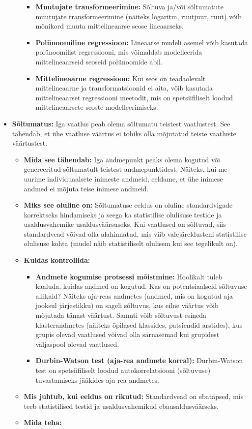 \documentclass[
]{book}
\providecommand{\tightlist}{%
  \setlength{\itemsep}{0pt}\setlength{\parskip}{0pt}}
\begin{document}
\begin{itemize}
\begin{itemize}
    \begin{itemize}
    \tightlist
    \item
      \textbf{Muutujate transformeerimine:} Sõltuva ja/või sõltumatute muutujate transformeerimine (näiteks logaritm, ruutjuur, ruut) võib mõnikord muuta mittelineaarse seose lineaarseks.
    \item
      \textbf{Polünoomiline regressioon:} Lineaarse mudeli asemel võib kasutada polünoomilist regressiooni, mis võimaldab modelleerida mittelineaarseid seoseid polünoomide abil.
    \item
      \textbf{Mittelineaarne regressioon:} Kui seos on teadaolevalt mittelineaarne ja transformatsioonid ei aita, võib kasutada mittelineaarset regressiooni meetodit, mis on spetsiifiliselt loodud mittelineaarsete seoste modelleerimiseks.
    \end{itemize}
  \end{itemize}
\item
  \textbf{Sõltumatus:} Iga vaatlus peab olema sõltumatu teistest vaatlustest. See tähendab, et ühe vaatluse väärtus ei tohiks olla mõjutatud teiste vaatluste väärtustest.

  \begin{itemize}
  \tightlist
  \item
    \textbf{Mida see tähendab:} Iga andmepunkt peaks olema kogutud või genereeritud sõltumatult teistest andmepunktidest. Näiteks, kui me uurime individuaalsete inimeste andmeid, eeldame, et ühe inimese andmed ei mõjuta teise inimese andmeid.
  \item
    \textbf{Miks see oluline on:} Sõltumatuse eeldus on oluline standardvigade korrektseks hindamiseks ja seega ka statistilise olulisuse testide ja usaldusvahemike usaldusväärsuseks. Kui vaatlused on sõltuvad, siis standardvead võivad olla alahinnatud, mis viib valejäreldusteni statistilise olulisuse kohta (mudel näib statistiliselt olulisem kui see tegelikult on).
  \item
    \textbf{Kuidas kontrollida:}

    \begin{itemize}
    \tightlist
    \item
      \textbf{Andmete kogumise protsessi mõistmine:} Hoolikalt tuleb kaaluda, kuidas andmed on kogutud. Kas on potentsiaalseid sõltuvuse allikaid? Näiteks aja-reas andmetes (andmed, mis on kogutud aja jooksul järjestikku) on sageli sõltuvus, kus eilne väärtus võib mõjutada tänast väärtust. Samuti võib sõltuvust esineda klasterandmetes (näiteks õpilased klassides, patsiendid arstides), kus grupis olevad vaatlused võivad olla sarnasemad kui grupidest väljaspool olevad vaatlused.
    \item
      \textbf{Durbin-Watson test (aja-rea andmete korral):} Durbin-Watson test on spetsiifiliselt loodud autokorrelatsiooni (sõltuvuse) tuvastamiseks jääkides aja-rea andmetes.
    \end{itemize}
  \item
    \textbf{Mis juhtub, kui eeldus on rikutud:} Standardvead on ebatäpsed, mis teeb statistilised testid ja usaldusvahemikud ebausaldusväärseks.
  \item
    \textbf{Mida teha:}


\end{itemize}
\end{itemize}
\end{document}
